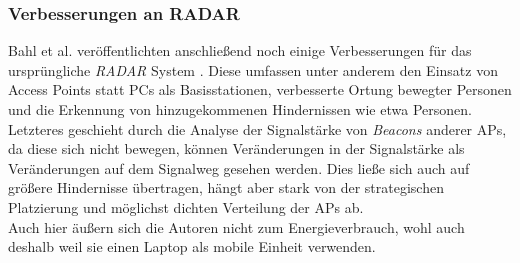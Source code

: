 \subsubsection{Verbesserungen an RADAR}
Bahl et al. veröffentlichten anschließend noch einige Verbesserungen für das ursprüngliche \emph{RADAR} System \cite{bahl2000enhancements}.
Diese umfassen unter anderem den Einsatz von Access Points statt PCs als Basisstationen, verbesserte Ortung bewegter Personen und die Erkennung von hinzugekommenen Hindernissen wie etwa Personen.
Letzteres geschieht durch die Analyse der Signalstärke von \emph{Beacons} anderer APs, da diese sich nicht bewegen, können Veränderungen in der Signalstärke als Veränderungen auf dem Signalweg gesehen werden.
Dies ließe sich auch auf größere Hindernisse übertragen, hängt aber stark von der strategischen Platzierung und möglichst dichten Verteilung der APs ab.\\
Auch hier äußern sich die Autoren nicht zum Energieverbrauch, wohl auch deshalb weil sie einen Laptop als mobile Einheit verwenden.

